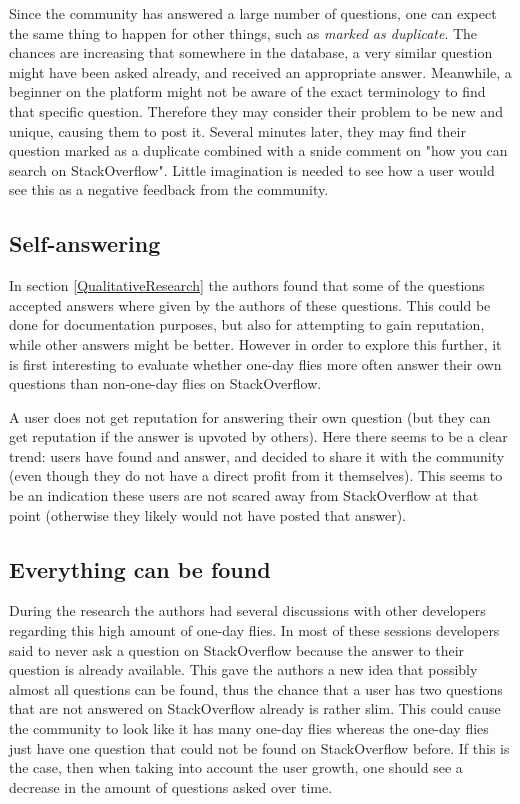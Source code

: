 \documentclass[conference]{IEEEtran}
\begin{document}
Since the community has answered a large number of questions, one can expect
the same thing to happen for other things, such as \textit{marked as
duplicate}. The chances are increasing that somewhere in the database, a very
similar question might have been asked already, and received an appropriate
answer. Meanwhile, a beginner on the platform might not be aware of the exact
terminology to find that specific question. Therefore they may consider their
problem to be new and unique, causing them to post it. Several minutes later,
they may find their question marked as a duplicate combined with a snide
comment on "how you can search on StackOverflow". Little imagination is needed
to see how a user would see this as a negative feedback from the community.


\subsection{Self-answering}
In section \ref{QualitativeResearch}  the authors found that some of the
questions accepted answers where given by the authors of these questions. This
could be done for documentation purposes, but also for attempting to gain
reputation, while other answers might be better. However in order to explore
this further, it is first interesting to evaluate whether one-day flies more
often answer their own questions than non-one-day flies on StackOverflow.

A user does not get reputation for answering their own question (but they can
get reputation if the answer is upvoted by others). Here there seems to be a
clear trend: users have found and answer, and decided to share it with the
community (even though they do not have a direct profit from it themselves).
This seems to be an indication these users are not scared away from
StackOverflow at that point (otherwise they likely would not have posted that
answer). 

\subsection{Everything can be found}
During the research the authors had several discussions with other developers
regarding this high amount of one-day flies. In most of these sessions
developers said to never ask a question on StackOverflow because the answer to
their question is already available. This gave the authors a new idea that
possibly almost all questions can be found, thus the chance that a user has two
questions that are not answered on StackOverflow already is rather slim. This
could cause the community to look like it has many one-day flies whereas the
one-day flies just have one question that could not be found on StackOverflow
before. If this is the case, then when taking into account the user growth, one
should see a decrease in the amount of questions asked over time. 
\end{document}

